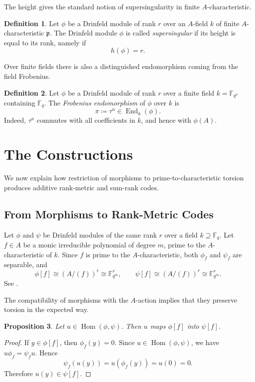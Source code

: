 \documentclass[10pt,a4paper]{amsart}
\DeclareMathOperator{\End}{End}
\DeclareMathOperator{\Hom}{Hom}
\theoremstyle{definition}
\newtheorem{definition}{Definition}[section]
\theoremstyle{plain}
\newtheorem{proposition}[definition]{Proposition}
\theoremstyle{remark}
\newcommand{\vF}{\mathbb F}
\newcommand{\p}{\mathfrak p}
\begin{document}
The height gives the standard notion of supersingularity in finite $A$-characteristic.

\begin{definition}
Let $\phi$ be a Drinfeld module of rank $r$ over an $A$-field $k$ of finite $A$-characteristic $\p$. The Drinfeld module $\phi$ is called \emph{supersingular} if its height is equal to its rank, namely if
$$
h(\phi)=r.
$$
\end{definition}

Over finite fields there is also a distinguished endomorphism coming from the field Frobenius.

\begin{definition}
Let $\phi$ be a Drinfeld module of rank $r$ over a finite field $k=\vF_{q^n}$ containing $\vF_q$. The \emph{Frobenius endomorphism} of $\phi$ over $k$ is
$$
\pi\coloneqq \tau^n\in \End_k(\phi).
$$
Indeed, $\tau^n$ commutes with all coefficients in $k$, and hence with $\phi(A)$.
\end{definition}

\section{The Constructions}

We now explain how restriction of morphisms to prime-to-characteristic torsion produces additive rank-metric and sum-rank codes.

\subsection{From Morphisms to Rank-Metric Codes}

Let $\phi$ and $\psi$ be Drinfeld modules of the same rank $r$ over a field
$k\supseteq \vF_q$.  Let $f\in A$ be a monic irreducible polynomial of degree
$m$, prime to the $A$-characteristic of $k$.  Since $f$ is prime to the
$A$-characteristic, both $\phi_f$ and $\psi_f$ are separable, and
$$
    \phi[f]\cong (A/(f))^r\cong \vF_{q^m}^r,
    \qquad
    \psi[f]\cong (A/(f))^r\cong \vF_{q^m}^r.
$$
See \cite[Corollary 3.5.3]{Pap23}.

The compatibility of morphisms with the $A$-action implies that they preserve torsion in the expected way.

\begin{proposition}
Let $u\in \Hom(\phi,\psi)$. Then $u$ maps $\phi[f]$ into $\psi[f]$.
\end{proposition}

\begin{proof}
If $y\in \phi[f]$, then $\phi_f(y)=0$. Since $u\in\Hom(\phi,\psi)$, we have $u\phi_f=\psi_f u$. Hence
$$
\psi_f(u(y))=u(\phi_f(y))=u(0)=0.
$$
Therefore $u(y)\in\psi[f]$.
\end{proof}
\end{document}
